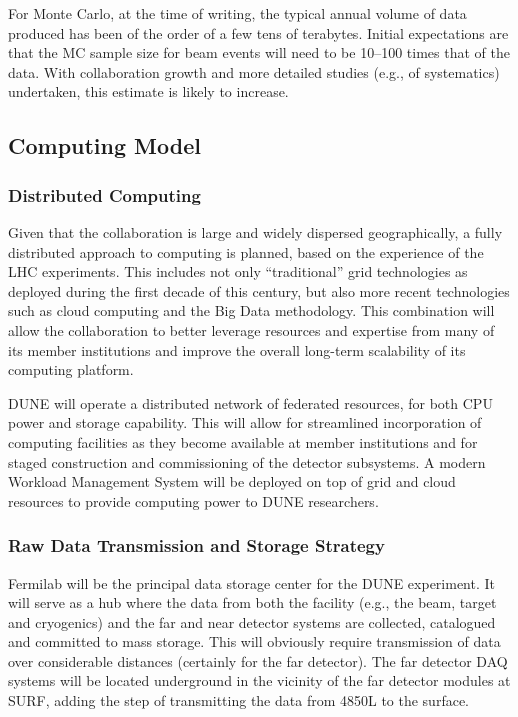 For Monte Carlo, at the time of writing, the typical annual volume of data
produced has been of the order of a few tens of terabytes.  Initial
expectations are that the MC sample size for beam events will need to
be 10--100 times that of the data.  With collaboration growth
and more detailed studies (e.g., of systematics) undertaken, 
this estimate is likely to increase.

\subsection{Computing Model}
\label{sec:detectors-sc-infrastructure-computing-model}

\subsubsection{Distributed Computing}


Given that the collaboration is large and widely dispersed
geographically, a fully distributed approach to computing is planned,
based on the experience of the LHC
experiments. This includes not only ``traditional'' grid technologies
as deployed during the first decade of this
century, but also more recent technologies such as cloud computing and the Big
Data methodology. This combination will allow the collaboration to better
leverage resources and expertise from many of its member institutions
and improve the overall long-term scalability of its computing
platform.

DUNE will operate a distributed network of federated resources, for
both CPU power and storage capability. This will allow for streamlined
incorporation of computing facilities as they become available at
member institutions and %
for staged construction and commissioning of the detector subsystems. A
modern Workload Management System will be deployed on top of grid and
cloud resources to provide computing power to DUNE researchers.

\subsubsection{Raw Data Transmission and Storage Strategy}
Fermilab will be the principal data storage center for the DUNE experiment. It
will serve as a hub where the data from both the facility (e.g., the beam,
target and cryogenics) and the %
far and near detector systems are collected, catalogued and committed to mass
storage. This will obviously require transmission of data over
considerable distances (certainly for the far detector). %
The far detector DAQ systems %
will be located underground in the vicinity of the far detector modules at SURF, adding the %
step of transmitting the data from 4850L to the surface.

